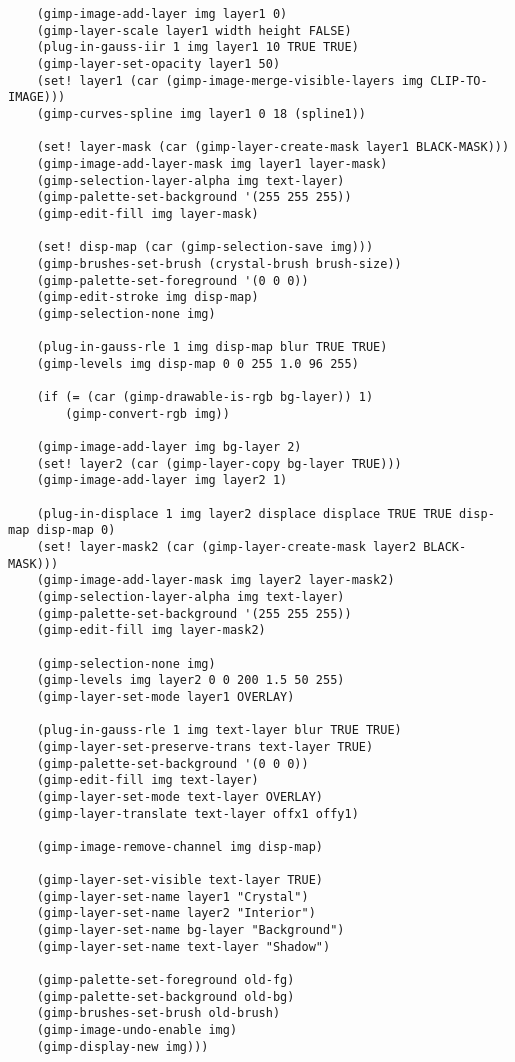 \documentclass{article}
\begin{document}
{\begin{verbatim}
    (gimp-image-add-layer img layer1 0)
    (gimp-layer-scale layer1 width height FALSE)
    (plug-in-gauss-iir 1 img layer1 10 TRUE TRUE)
    (gimp-layer-set-opacity layer1 50)
    (set! layer1 (car (gimp-image-merge-visible-layers img CLIP-TO-IMAGE)))
    (gimp-curves-spline img layer1 0 18 (spline1))

    (set! layer-mask (car (gimp-layer-create-mask layer1 BLACK-MASK)))
    (gimp-image-add-layer-mask img layer1 layer-mask)
    (gimp-selection-layer-alpha img text-layer)
    (gimp-palette-set-background '(255 255 255))
    (gimp-edit-fill img layer-mask)

    (set! disp-map (car (gimp-selection-save img)))
    (gimp-brushes-set-brush (crystal-brush brush-size))
    (gimp-palette-set-foreground '(0 0 0))
    (gimp-edit-stroke img disp-map)
    (gimp-selection-none img)

    (plug-in-gauss-rle 1 img disp-map blur TRUE TRUE)
    (gimp-levels img disp-map 0 0 255 1.0 96 255)

    (if (= (car (gimp-drawable-is-rgb bg-layer)) 1)
        (gimp-convert-rgb img))

    (gimp-image-add-layer img bg-layer 2)
    (set! layer2 (car (gimp-layer-copy bg-layer TRUE)))
    (gimp-image-add-layer img layer2 1)

    (plug-in-displace 1 img layer2 displace displace TRUE TRUE disp-map disp-map 0)
    (set! layer-mask2 (car (gimp-layer-create-mask layer2 BLACK-MASK)))
    (gimp-image-add-layer-mask img layer2 layer-mask2)
    (gimp-selection-layer-alpha img text-layer)
    (gimp-palette-set-background '(255 255 255))
    (gimp-edit-fill img layer-mask2)

    (gimp-selection-none img)
    (gimp-levels img layer2 0 0 200 1.5 50 255)
    (gimp-layer-set-mode layer1 OVERLAY)

    (plug-in-gauss-rle 1 img text-layer blur TRUE TRUE)
    (gimp-layer-set-preserve-trans text-layer TRUE)
    (gimp-palette-set-background '(0 0 0))
    (gimp-edit-fill img text-layer)
    (gimp-layer-set-mode text-layer OVERLAY)
    (gimp-layer-translate text-layer offx1 offy1)

    (gimp-image-remove-channel img disp-map)

    (gimp-layer-set-visible text-layer TRUE)
    (gimp-layer-set-name layer1 "Crystal")
    (gimp-layer-set-name layer2 "Interior")
    (gimp-layer-set-name bg-layer "Background")
    (gimp-layer-set-name text-layer "Shadow")

    (gimp-palette-set-foreground old-fg)
    (gimp-palette-set-background old-bg)
    (gimp-brushes-set-brush old-brush)
    (gimp-image-undo-enable img)
    (gimp-display-new img)))
\end{verbatim}}
\twocolumn
\end{document}
